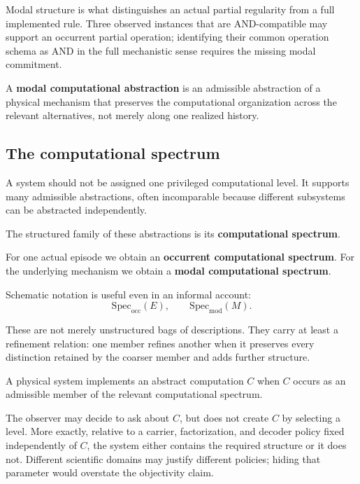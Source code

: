 \documentclass[11pt,a4paper]{article}
\begin{document}
Modal structure is what distinguishes an actual partial regularity from a full implemented rule. Three observed instances that are AND-compatible may support an occurrent partial operation; identifying their common operation schema as AND in the full mechanistic sense requires the missing modal commitment.

\begin{definitionbox}
A \textbf{modal computational abstraction} is an admissible abstraction of a physical mechanism that preserves the computational organization across the relevant alternatives, not merely along one realized history.
\end{definitionbox}

\subsection{The computational spectrum}

A system should not be assigned one privileged computational level. It supports many admissible abstractions, often incomparable because different subsystems can be abstracted independently.

The structured family of these abstractions is its \textbf{computational spectrum}.

For one actual episode we obtain an \textbf{occurrent computational spectrum}. For the underlying mechanism we obtain a \textbf{modal computational spectrum}.

Schematic notation is useful even in an informal account:
\[
\mathrm{Spec}_{\mathrm{occ}}(E),
\qquad
\mathrm{Spec}_{\mathrm{mod}}(M).
\]

These are not merely unstructured bags of descriptions. They carry at least a refinement relation: one member refines another when it preserves every distinction retained by the coarser member and adds further structure.

\begin{thesisbox}[title={Implementation without an observer-selected level}]
A physical system implements an abstract computation $C$ when $C$ occurs as an admissible member of the relevant computational spectrum.

The observer may decide to ask about $C$, but does not create $C$ by selecting a level. More exactly, relative to a carrier, factorization, and decoder policy fixed independently of $C$, the system either contains the required structure or it does not. Different scientific domains may justify different policies; hiding that parameter would overstate the objectivity claim.
\end{thesisbox}
\end{document}
